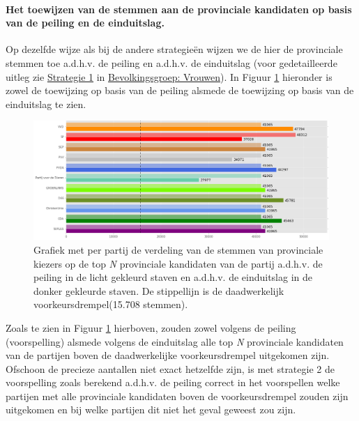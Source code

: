 \paragraph{Het toewijzen van de stemmen aan de provinciale kandidaten op basis van de peiling en de einduitslag.}
Op dezelfde wijze als bij de andere strategie\"{e}n wijzen we de hier de provinciale stemmen toe a.d.h.v. de peiling en a.d.h.v. de einduitslag (voor gedetailleerde uitleg zie \hyperref[S1V]{Strategie 1} in \hyperref[vrouwen]{Bevolkingsgroep: Vrouwen}). In Figuur \ref{fig:stemmenS1P} hieronder is zowel de toewijzing op basis van de peiling alsmede de toewijzing op basis van de einduitslag te zien.



\begin{figure}[H]

	\includegraphics[width=\linewidth]	{stemmen_op_provincialen_topN_samen.png}

			\caption{Grafiek met per partij de verdeling van de stemmen van provinciale kiezers op de top \textit{N} provinciale kandidaten van de partij a.d.h.v. de peiling \citep{IPSOS} in de licht gekleurd staven en a.d.h.v. de einduitslag \citep{Kiesraad_databank} in de donker gekleurde staven. De stippellijn is de daadwerkelijk voorkeursdrempel(15.708 stemmen).}

\label{fig:stemmenS1P}
\end{figure}


Zoals te zien in Figuur \ref{fig:stemmenS1P} hierboven, zouden zowel volgens de peiling (voorspelling) alsmede volgens de einduitslag alle top \textit{N} provinciale kandidaten van de partijen boven de daadwerkelijke voorkeursdrempel uitgekomen zijn. Ofschoon de precieze aantallen niet exact hetzelfde zijn, is met strategie 2 de voorspelling zoals berekend a.d.h.v. de peiling correct in het voorspellen welke partijen met alle provinciale kandidaten boven de voorkeursdrempel zouden zijn uitgekomen en bij welke partijen dit niet het geval geweest zou zijn.

